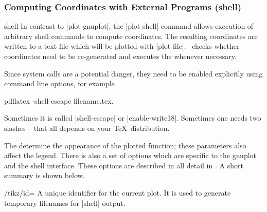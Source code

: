 \subsubsection{Computing Coordinates with External Programs (shell)}

\begin{addplotoperation}[]{shell}{}
In contrast to |plot gnuplot|, the |plot shell| command allows execution of arbitrary shell commands to compute coordinates. The resulting coordinates are written to a text file which will be plotted with |plot file|. \PGF\ checks whether coordinates need to be re-generated and executes the  whenever necessary.

Since system calls are a potential danger, they need to be enabled explicitly using command line options, for example
\begin{codeexample}
pdflatex -shell-escape filename.tex.
\end{codeexample}
Sometimes it is called |shell-escape| or |enable-write18|. Sometimes one needs two slashes -- that all depends on your \TeX\ distribution.
\begin{codeexample}[]
\end{codeexample}

\begin{codeexample}[]
\end{codeexample}

The  determine the appearance of the plotted function; these parameters also affect the legend. There is also a set of options which are specific to the gnuplot and the shell interface. These options are described in all detail in \cite[section~19.6]{tikz}. A short summary is shown below.
\end{addplotoperation}

\begin{key}{/tikz/id=}
	 A unique identifier for the current plot. It is used to generate temporary filenames for |shell| output.
\end{key}

